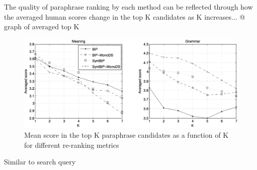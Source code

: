 \documentclass[11pt]{article}
\begin{document}


The quality of paraphrase ranking by each method can be reflected through how the averaged human scores change in the top K candidates as K increases... @ graph of averaged top K

\begin{figure}
\begin{center}
\includegraphics{meanTopK} %
\end{center}
\caption{\small Mean score in the top K paraphrase candidates as a function of K for different re-ranking metrics}
\label{paraphrase-illustration}
\end{figure}

Similar to search query 
\end{document}
